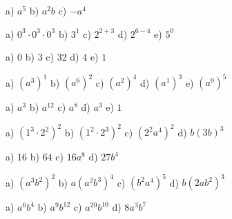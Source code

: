 \begin{tehtavasivu}
\begin{tehtava}
        \begin{vastaus}
            a) $a^5$ \qquad
            b) $a^2b$ \qquad
            c) $-a^4$
        \end{vastaus}
    \end{tehtava}

    \begin{tehtava}
        a) $0^3\cdot0^3\cdot0^3$ \qquad
        b) $3^1$ \qquad
        c) $2^{2+3}$ \qquad
        d) $2^{6-4}$ \qquad
        e) $5^0$

        \begin{vastaus}
            a) $0$ \qquad
            b) $3$ \qquad
            c) $32$ \qquad
            d) $4$ \qquad
            e) $1$
        \end{vastaus}
    \end{tehtava}
    \begin{tehtava}
        a) $(a^3)^1$ \qquad
        b) $(a^6)^2$ \qquad
        c) $(a^2)^4$ \qquad 
        d) $(a^1)^3$ \qquad
        e) $(a^0)^5$

        \begin{vastaus}
            a) $a^3$ \qquad
            b) $a^{12}$ \qquad
            c) $a^8$ \qquad
            d) $a^3$ \qquad
            e) $1$
        \end{vastaus}
    \end{tehtava}
    
       \begin{tehtava}
        a) $(1^3\cdot 2^2)^2$ \qquad
        b) $(1^2\cdot 2^3)^2$ \qquad
        c) $(2^2a^4)^2$ \qquad
        d) $b(3b)^3$

        \begin{vastaus}
            a) $16$ \qquad
            b) $64$ \qquad
            c) $16a^8$ \qquad
            d) $27b^4$
        \end{vastaus}
    \end{tehtava}
    
    \begin{tehtava}
        a) $(a^3b^2)^2$ \qquad
        b) $a(a^2b^3)^4$ \qquad
        c) $(b^2a^4)^5$ \qquad
        d) $b(2ab^2)^3$
        
        \begin{vastaus}
            a) $a^6b^4$ \qquad
            b) $a^9b^{12}$ \qquad
            c) $a^{20}b^{10}$ \qquad
            d) $8a^3b^7$
        \end{vastaus}
    \end{tehtava}
      

\end{tehtavasivu}
